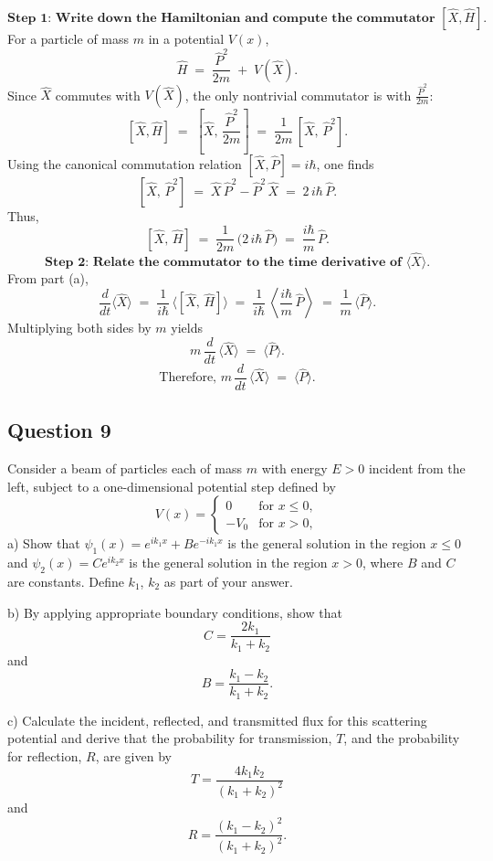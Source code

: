 \documentclass{article}
\begin{document}
\[
\textbf{Step 1: Write down the Hamiltonian and compute the commutator }[\hat{X},\hat{H}].
\]
For a particle of mass \(m\) in a potential \(V(x)\),
\[
\hat{H} \;=\;\frac{\hat{P}^2}{2m}\;+\;V(\hat{X}).
\]
Since \(\hat{X}\) commutes with \(V(\hat{X})\), the only nontrivial commutator is with \(\frac{\hat{P}^2}{2m}\):
\[
[\hat{X},\hat{H}] 
\;=\;\left[\hat{X},\,\frac{\hat{P}^2}{2m}\right] 
\;=\;\frac{1}{2m}\,[\hat{X},\,\hat{P}^2].
\]
Using the canonical commutation relation \([\hat{X},\hat{P}] = i\hbar\), one finds
\[
[\hat{X},\,\hat{P}^2] 
\;=\;\hat{X}\,\hat{P}^2 - \hat{P}^2\,\hat{X} 
\;=\;2\,i\hbar\,\hat{P}.
\]
Thus,
\[
[\hat{X},\,\hat{H}] 
\;=\;\frac{1}{2m}\,\bigl(2\,i\hbar\,\hat{P}\bigr) 
\;=\;\frac{i\hbar}{m}\,\hat{P}.
\]
\[
\textbf{Step 2: Relate the commutator to the time derivative of }\langle \hat{X}\rangle.
\]
From part (a),
\[
\frac{d}{dt}\langle \hat{X}\rangle 
\;=\;\frac{1}{i\hbar}\,\langle [\hat{X},\,\hat{H}]\rangle 
\;=\;\frac{1}{i\hbar}\,\left\langle \frac{i\hbar}{m}\,\hat{P}\right\rangle 
\;=\;\frac{1}{m}\,\langle \hat{P}\rangle.
\]
Multiplying both sides by \(m\) yields
\[
m\,\frac{d}{dt}\,\langle \hat{X}\rangle 
\;=\;\langle \hat{P}\rangle.
\]
\[
\boxed{
\text{Therefore, } m\,\frac{d}{dt}\,\langle \hat{X}\rangle 
\;=\;\langle \hat{P}\rangle.
}
\]


\subsection{Question 9}
Consider a beam of particles each of mass $m$ with energy $E > 0$ incident from the left, subject to a one-dimensional potential step defined by
\[
V(x) =
\begin{cases}
0 & \text{for } x \leq 0, \\
-V_0 & \text{for } x > 0,
\end{cases}
\]
a) Show that $\psi_1(x) = e^{ik_1x} + Be^{-ik_1x}$ is the general solution in the region $x \leq 0$ and $\psi_2(x) = Ce^{ik_2x}$ is the general solution in the region $x > 0$, where $B$ and $C$ are constants. Define $k_1$, $k_2$ as part of your answer.

b) By applying appropriate boundary conditions, show that
\[
C = \frac{2k_1}{k_1 + k_2}
\]
and
\[
B = \frac{k_1 - k_2}{k_1 + k_2}.
\]

c) Calculate the incident, reflected, and transmitted flux for this scattering potential and derive that the probability for transmission, $T$, and the probability for reflection, $R$, are given by
\[
T = \frac{4k_1k_2}{(k_1 + k_2)^2}
\]
and
\[
R = \frac{(k_1 - k_2)^2}{(k_1 + k_2)^2}.
\]
\end{document}
